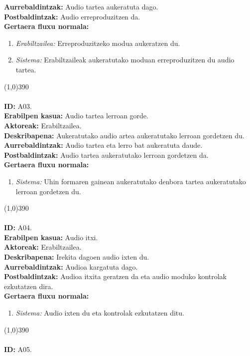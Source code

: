\textbf{Aurrebaldintzak:} Audio tartea aukeratuta dago.\\
\textbf{Postbaldintzak:} Audio erreproduzitzen da.\\
\textbf{Gertaera fluxu normala:}
\begin{enumerate}
	\item \textit{Erabiltzailea:} Erreproduzitzeko modua aukeratzen du.
	\item \textit{Sistema:} Erabiltzaileak aukeratutako moduan erreproduzitzen du audio tartea.
\end{enumerate}
\line(1,0){390}\\
\noindent\\
\textbf{ID:} A03.\\
\textbf{Erabilpen kasua:} Audio tartea lerroan gorde.\\
\textbf{Aktoreak:} Erabiltzailea.\\
\textbf{Deskribapena:} Aukeratutako audio artea aukeratutako lerroan gordetzen du.\\
\textbf{Aurrebaldintzak:} Audio tartea eta lerro bat aukeratuta daude.\\
\textbf{Postbaldintzak:} Audio tartea aukeratutako lerroan gordetzen da.\\
\textbf{Gertaera fluxu normala:}
\begin{enumerate}
	\item \textit{Sistema:} Uhin formaren gainean aukeratutako denbora tartea aukeratutako lerroan gordetzen du.
\end{enumerate}
\line(1,0){390}\\
\noindent\\
\textbf{ID:} A04.\\
\textbf{Erabilpen kasua:} Audio itxi.\\
\textbf{Aktoreak:} Erabiltzailea.\\
\textbf{Deskribapena:} Irekita dagoen audio ixten du.\\
\textbf{Aurrebaldintzak:} Audioa kargatuta dago.\\
\textbf{Postbaldintzak:} Audioa itxita geratzen da eta audio moduko kontrolak ezkutatzen dira.\\
\textbf{Gertaera fluxu normala:}
\begin{enumerate}
	\item \textit{Sistema:} Audio ixten du eta kontrolak ezkutatzen ditu.
\end{enumerate}
\line(1,0){390}\\
\noindent\\
\textbf{ID:} A05.\\
